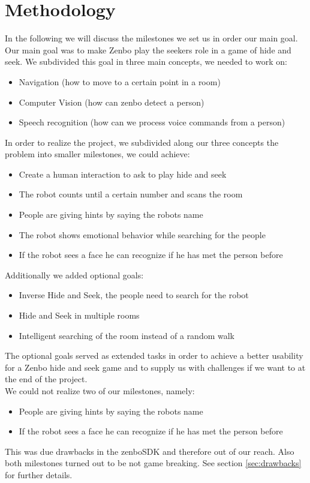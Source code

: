 \documentclass[conference]{IEEEtran}
\begin{document}
\section{Methodology}
In the following we will discuss the milestones we set us in order our main goal.
Our main goal was to make Zenbo play the seekers role in a game of hide and seek.
We subdivided this goal in three main concepts, we needed to work on:
\begin{itemize}
	\item Navigation (how to move to a certain point in a room)
	\item Computer Vision (how can zenbo detect a person)
	\item Speech recognition (how can we process voice commands from a person)
\end{itemize}
In order to realize the project, we subdivided along our three concepts the problem into smaller milestones, we could achieve:
\begin{itemize}
	\item Create a human interaction to ask to play hide and seek
	\item The robot counts until a certain number and scans the room
	\item People are giving hints by saying the robots name
	\item The robot shows emotional behavior while searching for the people
	\item If the robot sees a face he can recognize if he has met the person before
\end{itemize}
Additionally we added optional goals:
\begin{itemize}
	\item Inverse Hide and Seek, the people need to search for the robot
	\item Hide and Seek in multiple rooms
	\item Intelligent searching of the room instead of a random walk
\end{itemize}
The optional goals served as extended tasks in order to achieve a better usability for a Zenbo hide and seek game and to
supply us with challenges if we want to at the end of the project.\\
We could not realize two of our milestones, namely:
\begin{itemize}
	\item People are giving hints by saying the robots name
	\item If the robot sees a face he can recognize if he has met the person before
\end{itemize}
This was due drawbacks in the zenboSDK and therefore out of our reach.
Also both milestones turned out to be not game breaking. See section \ref{sec:drawbacks} for further details.
\\\\
\end{document}
